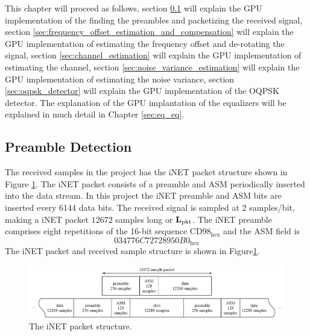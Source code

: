 This chapter will proceed as follows, 
section \ref{sec:preamble_detection} will explain the GPU implementation of the finding the preambles and packetizing the received signal,
section \ref{sec:frequency_offset_estimation_and_compensation} will explain the GPU implementation of estimating the frequency offset and de-rotating the signal,
section \ref{sec:channel_estimation} will explain the GPU implementation of estimating the channel,
section \ref{sec:noise_variance_estimation} will explain the GPU implementation of estimating the noise variance,
section \ref{sec:oqpsk_detector} will explain the GPU implementation of the OQPSK detector.
The explanation of the GPU implantation of the equalizers will be explained in much detail in Chapter \ref{sec:eq_eq}.





















\subsection{Preamble Detection}
\label{sec:preamble_detection}
The received samples in the project has the iNET packet structure shown in Figure \ref{fig:packet}.
The iNET packet consists of a preamble and ASM periodically inserted into the data stream.
In this project the iNET preamble and ASM bits are inserted every 6144 data bits.
The received signal is sampled at 2 samples/bit, making a iNET packet $12672$ samples long or $\mathbf{L}_\text{pkt}$.
The iNET preamble comprises eight repetitions of the 16-bit sequence $\text{CD98}_\text{hex}$ and the ASM field is
\begin{equation}
034776C72728950B0_\text{hex}
\end{equation}
The iNET packet and received sample structure is shown in Figure\ref{fig:packet}.
\begin{figure}
	\centering\includegraphics[width=\textwidth]{figures/gpu/packet.png}
	\caption{The iNET packet structure.}
	\label{fig:packet}
\end{figure}

